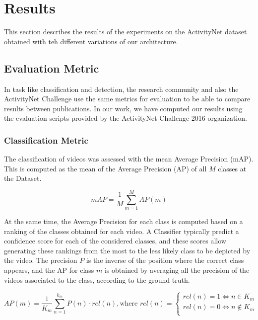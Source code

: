 \chapter{Results}
\label{section:results}

This section describes the results of the experiments on the ActivityNet dataset obtained with teh different variations of our architecture.

\section{Evaluation Metric}

In task like classification and detection, the research community and also the ActivityNet Challenge use the same metrics for evaluation to be able to compare results between publications. In our work, we have computed our results using the evaluation scripts provided by the ActivityNet Challenge 2016 organization.

\subsection{Classification Metric}

The classification of videos was assessed with the mean Average Precision (mAP). This is computed as the mean of the Average Precision (AP) of all $M$ classes at the Dataset.

\begin{equation}
	mAP = \frac{1}{M} \sum_{m=1}^{M} AP(m)
\end{equation}

At the same time, the Average Precision for each class is computed based on a ranking of the classes obtained for each video. A Classifier typically predict a confidence score for each of the considered classes, and these scores allow generating these rankings from the most to the less likely class to be depicted by the video. The precision $P$ is the inverse of the position where the correct class appears, and the AP for class $m$ is obtained by averaging all the precision of the videos associated to the class, according to the ground truth. %

\begin{equation}
	AP(m) = \frac{1}{K_m} \sum_{n=1}^{k_m} P(n) \cdot rel(n), \text{where } rel(n) = \begin{cases}
        rel(n) = 1 \Leftrightarrow n \in K_m \\
        rel(n) = 0 \Leftrightarrow n \notin K_m \\
\end{cases}
\end{equation}

